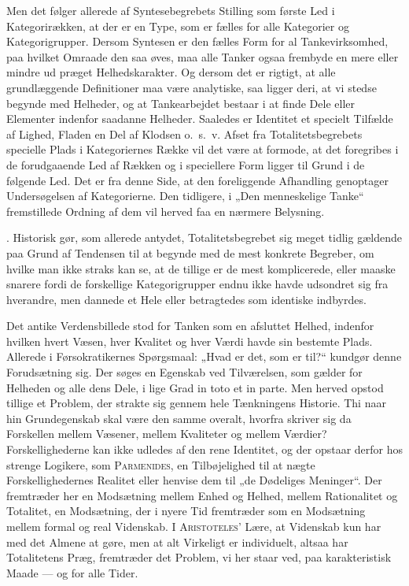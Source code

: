 \documentclass[12pt]{article}
\newcommand{\opage}[1]{\marginnote{\footnotesize\textit{[#1]}}}
\begin{document}
Men det følger allerede af Syntesebegrebets Stilling som første Led i
Kategorirækken, at der er en Type, som er fælles for alle Kategorier og Kategorigrupper.
Dersom Syntesen er den fælles Form for al Tankevirksomhed, paa hvilket Omraade
den saa øves, maa alle Tanker ogsaa frembyde en mere eller mindre ud%
\setcounter{footnote}{0}%
\opage{20}præget Helhedskarakter. Og dersom det er rigtigt, at alle grundlæggende
Definitioner maa være analytiske, saa ligger deri, at vi stedse begynde med Helheder, og
at Tankearbejdet bestaar i at finde Dele eller Elementer indenfor saadanne
Helheder. Saaledes er Identitet et specielt Tilfælde af Lighed, Fladen en Del af
Klodsen o.~s.~v. Afset fra Totalitetsbegrebets specielle Plads i Kategoriernes Række
vil det være at formode, at det foregribes i de forudgaaende Led af Rækken og i
speciellere Form ligger til Grund i de følgende Led. Det er fra denne Side, at
den foreliggende Afhandling genoptager Undersøgelsen af Kategorierne. Den
tidligere, i „Den menneskelige Tanke“ fremstillede Ordning af dem vil herved faa en
nærmere Belysning.

. Historisk gør, som allerede antydet, Totalitetsbegrebet sig meget tidlig
gældende paa Grund af Tendensen til at begynde med de mest konkrete Begreber,
om hvilke man ikke straks kan se, at de tillige er de mest komplicerede, eller
maaske snarere fordi de forskellige Kategorigrupper endnu ikke havde udsondret
sig fra hverandre, men dannede et Hele eller betragtedes som identiske indbyrdes.

Det antike Verdensbillede stod for Tanken som en afsluttet Helhed, indenfor
hvilken hvert Væsen, hver Kvalitet og hver Værdi havde sin bestemte Plads.
Allerede i Førsokratikernes Spørgsmaal: „Hvad er det, som er til?“ kundgør denne
Forudsætning sig. Der søges en Egenskab ved Tilværelsen, som gælder for
Helheden og alle dens Dele, i lige Grad in toto et in parte. Men herved opstod
tillige et Problem, der strakte sig gennem hele Tænkningens Historie. Thi naar hin
Grundegenskab skal være den samme overalt, hvorfra skriver sig da Forskellen
mellem Væsener, mellem Kvaliteter og mellem Værdier? Forskellighederne kan
ikke udledes af den rene Identitet, og der opstaar derfor hos strenge Logikere, som
\textsc{Parmenides}, en Tilbøjelighed til at nægte Forskellighedernes Realitet eller henvise
dem til „de Dødeliges Meninger“. Der fremtræder her en Modsætning mellem Enhed
og Helhed, mellem Rationalitet og Totalitet, en Modsætning, der i nyere Tid
fremtræder som en Modsætning mellem formal og real Videnskab. I \textsc{Aristoteles}' Lære,
at Videnskab kun har med det Almene at gøre, men at alt Virkeligt er individuelt,
altsaa har Totalitetens Præg, fremtræder det Problem, vi her staar ved, paa
karakteristisk Maade --- og for alle Tider.
\end{document}
